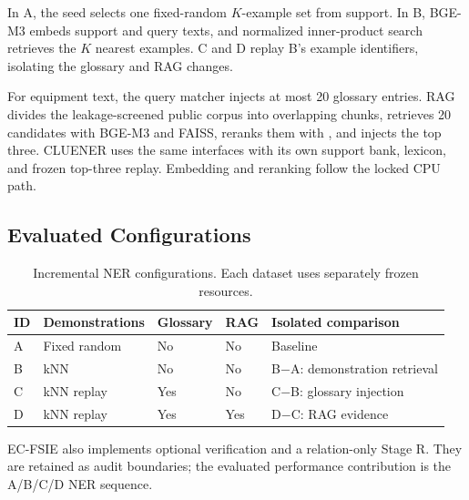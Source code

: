 In A, the seed selects one fixed-random $K$-example set from support. In B,
BGE-M3 \cite{chen2024m3} embeds support and query texts, and normalized
inner-product search retrieves the $K$ nearest examples. C and D replay B's
example identifiers, isolating the glossary and RAG changes.

For equipment text, the query matcher injects at most 20 glossary entries.
RAG divides the leakage-screened public corpus into overlapping chunks,
retrieves 20 candidates with BGE-M3 and FAISS, reranks them with
, and injects the top three. CLUENER uses the
same interfaces with its own support bank, lexicon, and frozen top-three replay.
Embedding and reranking follow the locked CPU path.

\subsection{Evaluated Configurations}

\begin{table}[ht]
\caption{Incremental NER configurations. Each dataset uses separately frozen
resources.}
\label{tab:configs}
\centering
\setlength{\tabcolsep}{3pt}
\begin{tabular}{>{\centering\arraybackslash}p{0.7cm}p{2.2cm}
>{\centering\arraybackslash}p{1.3cm}>{\centering\arraybackslash}p{1.2cm}p{4.6cm}}
\toprule
ID & Demonstrations & Glossary & RAG & Isolated comparison \\
\midrule
A & Fixed random & No & No & Baseline \\
B & kNN & No & No & B$-$A: demonstration retrieval \\
C & kNN replay & Yes & No & C$-$B: glossary injection \\
D & kNN replay & Yes & Yes & D$-$C: RAG evidence \\
\bottomrule
\end{tabular}
\end{table}

EC-FSIE also implements optional verification and a relation-only Stage R.
They are retained as audit boundaries; the evaluated performance contribution
is the A/B/C/D NER sequence.
